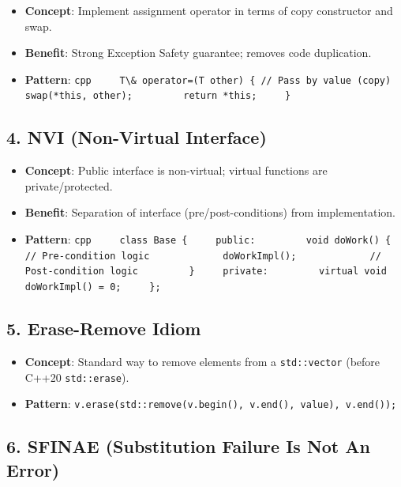 \begin{itemize}
\tightlist
\item
  \textbf{Concept}: Implement assignment operator in terms of copy
  constructor and swap.
\item
  \textbf{Benefit}: Strong Exception Safety guarantee; removes code
  duplication.
\item
  \textbf{Pattern}:
  \passthrough{\lstinline!cpp     T\& operator=(T other) \{ // Pass by value (copy)         swap(*this, other);         return *this;     \}!}
\end{itemize}

\hypertarget{nvi-non-virtual-interface}{%
\subsection{4. NVI (Non-Virtual
Interface)}\label{nvi-non-virtual-interface}}

\begin{itemize}
\tightlist
\item
  \textbf{Concept}: Public interface is non-virtual; virtual functions
  are private/protected.
\item
  \textbf{Benefit}: Separation of interface (pre/post-conditions) from
  implementation.
\item
  \textbf{Pattern}:
  \passthrough{\lstinline!cpp     class Base \{     public:         void doWork() \{             // Pre-condition logic             doWorkImpl();             // Post-condition logic         \}     private:         virtual void doWorkImpl() = 0;     \};!}
\end{itemize}

\hypertarget{erase-remove-idiom}{%
\subsection{5. Erase-Remove Idiom}\label{erase-remove-idiom}}

\begin{itemize}
\tightlist
\item
  \textbf{Concept}: Standard way to remove elements from a
  \passthrough{\lstinline!std::vector!} (before C++20
  \passthrough{\lstinline!std::erase!}).
\item
  \textbf{Pattern}:
  \passthrough{\lstinline!v.erase(std::remove(v.begin(), v.end(), value), v.end());!}
\end{itemize}

\hypertarget{sfinae-substitution-failure-is-not-an-error}{%
\subsection{6. SFINAE (Substitution Failure Is Not An
Error)}\label{sfinae-substitution-failure-is-not-an-error}}

